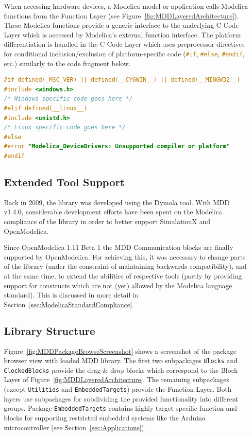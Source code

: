 \documentclass{resources/modelica}
\newcommand{\clang}[1]{\lstinline[language=c]|#1|}
\newcommand{\modelica}[1]{\lstinline[language=modelica]|#1|}
\begin{document}
When accessing hardware devices, a Modelica model or
application calls Modelica functions from the \textsf{Function Layer} (see
Figure~\ref{fig:MDDLayeredArchitecture}). These Modelica functions provide a
generic interface to the underlying \textsf{C-Code Layer} which is accessed by
Modelica's external function interface.
The platform differentiation is handled in the \textsf{C-Code Layer} which
uses preprocessor directives for conditional inclusion/exclusion of
platform-specific code (\mbox{\clang{#if}}, \mbox{\clang{#else}},
\mbox{\clang{#endif}}, etc.) similarly to the code fragment below.
\begin{lstlisting}[language=C]
#if defined(_MSC_VER) || defined(__CYGWIN__) || defined(__MINGW32__)
#include <windows.h>
/* Windows specific code goes here */
#elif defined(__linux__)
#include <unistd.h>
/* Linux specific code goes here */
#else
#error "Modelica_DeviceDrivers: Unsupported compiler or platform"
#endif
\end{lstlisting}

\subsection{Extended Tool Support}
\label{sec:ExtendedToolSupport}

Back in 2009, the library was developed using the Dymola tool. With MDD v1.4.0,
considerable development efforts have been spent on the Modelica compliance of
the library in order to better support SimulationX and OpenModelica.

Since OpenModelica 1.11 Beta 1 the MDD Communication blocks are finally
supported by OpenModelica. For achieving this, it was necessary to change parts
of the library (under the constraint of maintaining backwards compatibility),
and at the same time, to extend the abilities of respective tools (partly by
providing support for constructs which are not (yet) allowed by the Modelica
language standard). This is discussed in more detail in
Section~\ref{sec:ModelicaStandardCompliance}.


\subsection{Library Structure}
\label{sec:LibraryStructure}

Figure~\ref{fig:MDDPackageBrowseScreenshot} shows a screenshot of the package
browser view with loaded MDD library. The first two subpackages
\modelica{Blocks} and \modelica{ClockedBlocks} provide the drag \& drop blocks
which correspond to the \textsf{Block Layer} of
Figure~\ref{fig:MDDLayeredArchitecture}. The remaining subpackages (except
\modelica{Utilities} and \modelica{EmbeddedTargets}) provide the
\textsf{Function Layer}.
Both layers use subpackages for subdividing the provided functionality into
different groups. Package \modelica{EmbeddedTargets} contains highly
target specific function and blocks for supporting restricted
embedded systems like the Arduino microcontroller (see
Section~\ref{sec:Applications}).
\end{document}
